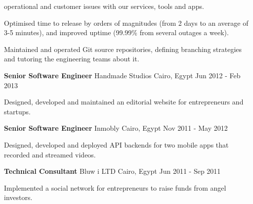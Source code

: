 \begin{cventries}
{\begin{cvitems}
{			            operational and customer issues with our services, tools and apps.
			      }
			\item {
			            Optimised time to release by orders of magnitudes (from 2 days to an
			            average of 3-5 minutes), and improved uptime (99.99\% from several
			            outages a week).
			      }
			\item {
			            Maintained and operated Git source repositories, defining branching
			            strategies and tutoring the engineering teams about it.
			      }
		\end{cvitems}
	}

	\cventry
	{\textbf{Senior Software Engineer}} %
	{Handmade Studios} %
	{Cairo, Egypt} %
	{Jun 2012 - Feb 2013} %
	{
		\begin{cvitems} %
			\item {
			            Designed, developed and maintained an editorial website for
			            entrepreneurs and startups.
			      }
		\end{cvitems}
	}

	\cventry
	{\textbf{Senior Software Engineer}} %
	{Inmobly} %
	{Cairo, Egypt} %
	{Nov 2011 - May 2012} %
	{
		\begin{cvitems} %
			\item {
			            Designed, developed and deployed API backends for two mobile apps that
			            recorded and streamed videos.
			      }
		\end{cvitems}
	}

	\cventry
	{\textbf{Technical Consultant}} %
	{Bluw i LTD} %
	{Cairo, Egypt} %
	{Jun 2011 - Sep 2011} %
	{
		\begin{cvitems} %
			\item {
			            Implemented a social network for entrepreneurs to raise funds from
			            angel investors.
			      }
		\end{cvitems}
	}


\end{cventries}
